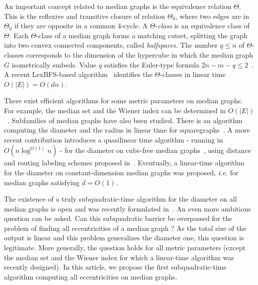 \documentclass[a4paper,UKenglish,numberwithinsect,cleveref, autoref]{lipics-v2021}
\newcommand{\card}[1]{\left| #1 \right|}
\begin{document}
An important concept related to median graphs is the equivalence relation $\Theta$. This is the reflexive and transitive closure of relation $\Theta_0$, where two edges are in $\Theta_0$ if they are opposite in a common 4-cycle. A $\Theta$-\textit{class} is an equivalence class of $\Theta$. Each $\Theta$-class of a median graph forms a matching cutset, splitting the graph into two convex connected components, called \textit{halfspaces}. The number $q \le n$ of $\Theta$-classes corresponds to the dimension of the hypercube in which the median graph $G$ isometrically embeds.  Value $q$ satisfies the Euler-type formula $2n-m-q\le 2$~\cite{KlMuSk98}. A recent LexBFS-based algorithm~\cite{BeChChVa20} identifies the $\Theta$-classes in linear time $O(\card{E})=O(dn)$.


There exist efficient algorithms for some metric parameters on median graphs. For example, the median set and the Wiener index can be determined in $O(\card{E})$~\cite{BeChChVa20}. 
Subfamilies of median graphs have also been studied. There is an algorithm computing the diameter and the radius in linear time for squaregraphs~\cite{ChDrVa02}. A more recent contribution introduces a quasilinear time algorithm - running in $O(n\log^{O(1)} n)$ - for the diameter on cube-free median graphs~\cite{Du20}, using distance and routing labeling schemes proposed in~\cite{ChLaRa19}. Eventually, a linear-time algorithm~\cite{BeHa21} for the diameter on constant-dimension median graphs was proposed, {\em i.e.} for median graphs satisfying $d=O(1)$.

The existence of a truly subquadratic-time algorithm for the diameter on all median graphs is open and was recently formulated in~\cite{BeChChVa20,BeHa21,Du20}. An even more ambitious question can be asked. Can this subquadratic barrier be overpassed for the problem of finding all eccentricities of a median graph ? As the total size of the output is linear and this problem generalizes the diameter one, this question is legitimate. More generally, the question holds for all metric parameters (except the median set and the Wiener index for which a linear-time algorithm was recently designed). In this article, we propose the first subquadratic-time algorithm computing all eccentricities on median graphs. 
\end{document}
